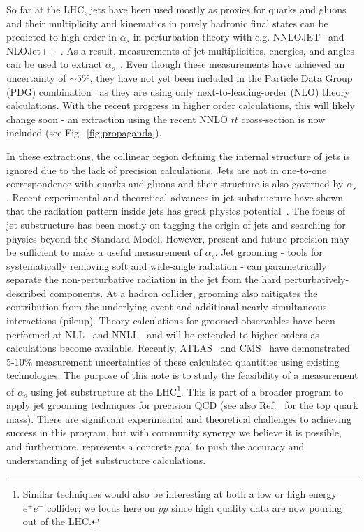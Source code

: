 So far at the LHC, jets have been used mostly as proxies for quarks and gluons and their multiplicity and kinematics in purely hadronic final states can be predicted to high order in $\alpha_s$ in perturbation theory with e.g. NNLOJET~\cite{Currie:2016bfm,Currie:2017ctp} and NLOJet++~\cite{Nagy:2001fj,Nagy:2003tz}.  As a result, measurements of jet multiplicities, energies, and angles can be used to extract $\alpha_s$~\cite{ATLAS:2015yaa,Aaboud:2017fml,Khachatryan:2014waa,CMS:2014mna,Chatrchyan:2013txa}.   Even though these measurements have achieved an uncertainty of $\sim 5\%$, they have not yet been included in the Particle Data Group (PDG) combination~\cite{Olive:2016xmw} as they are using only next-to-leading-order (NLO) theory calculations.  With the recent progress in higher order calculations, this will likely change soon - an extraction using the recent NNLO $t\bar{t}$ cross-section is now included (see Fig.~\ref{fig:propaganda}).

In these extractions, the collinear region defining the internal structure of jets is ignored due to the lack of precision calculations.  Jets are not in one-to-one correspondence with quarks and gluons and their structure is also governed by $\alpha_s$.  Recent experimental and theoretical advances in jet substructure have shown that the radiation pattern inside jets has great physics potential~\cite{Abdesselam:2010pt,Altheimer:2012mn,Altheimer:2013yza,Adams:2015hiv,Larkoski:2017jix}.  The focus of jet substructure has been mostly on tagging the origin of jets and searching for physics beyond the Standard Model.  However, present and future precision may be sufficient to make a useful measurement of $\alpha_s$.  Jet grooming - tools for systematically removing soft and wide-angle radiation - can parametrically separate the non-perturbative radiation in the jet from the hard perturbatively-described components.  At a hadron collider, grooming also mitigates the contribution from the underlying event and additional nearly simultaneous interactions (pileup).  Theory calculations for groomed observables have been performed at NLL~\cite{Marzani:2017kqd,Marzani:2017mva} and NNLL~\cite{Frye:2016aiz,Frye:2016okc} and will be extended to higher orders as calculations become available.  Recently, ATLAS~\cite{Aaboud:2017qwh} and CMS~\cite{CMS-PAS-SMP-16-010} have demonstrated 5-10\% measurement uncertainties of these calculated quantities using existing technologies.   The purpose of this note is to study the feasibility of a measurement of $\alpha_s$ using jet substructure at the LHC\footnote{Similar techniques would also be interesting at both a low or high energy $e^+e^-$ collider; we focus here on $pp$ since high quality data are now pouring out of the LHC.}.  This is part of a broader program to apply jet grooming techniques for precision QCD (see also Ref.~\cite{Hoang:2017kmk} for the top quark mass).  There are significant experimental and theoretical challenges to achieving success in this program, but with community synergy we believe it is possible, and furthermore, represents a concrete goal to push the accuracy and understanding of jet substructure calculations.



